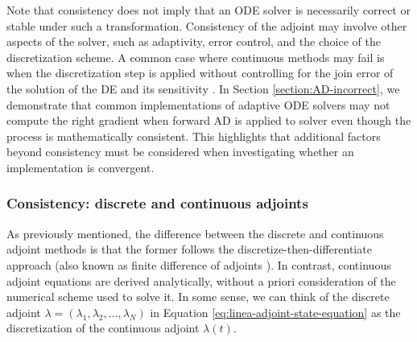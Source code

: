 Note that consistency does not imply that an ODE solver is necessarily correct or stable under such a transformation. 
Consistency of the adjoint may involve other aspects of the solver, such as adaptivity, error control, and the choice of the discretization scheme. 
A common case where continuous methods may fail is when the discretization step is applied without controlling for the join error of the solution of the DE and its sensitivity \cite{Gunzburger_2002}. 
In Section \ref{section:AD-incorrect}, we demonstrate that common implementations of adaptive ODE solvers may not compute the right gradient when forward AD is applied to solver even though the process is mathematically consistent. 
This highlights that additional factors beyond consistency must be considered when investigating whether an implementation is convergent.

\subsubsection{Consistency: discrete and continuous adjoints}

As previously mentioned, the difference between the discrete and continuous adjoint methods is that the former follows the discretize-then-differentiate approach (also known as finite difference of adjoints \cite{Sirkes_Tziperman_1997}).
In contrast, continuous adjoint equations are derived analytically, without a priori consideration of the numerical scheme used to solve it. 
In some sense, we can think of the discrete adjoint $\lambda = (\lambda_1, \lambda_2, \ldots, \lambda_N)$ in Equation \eqref{eq:linea-adjoint-state-equation} as the discretization of the continuous adjoint $\lambda(t)$. 

